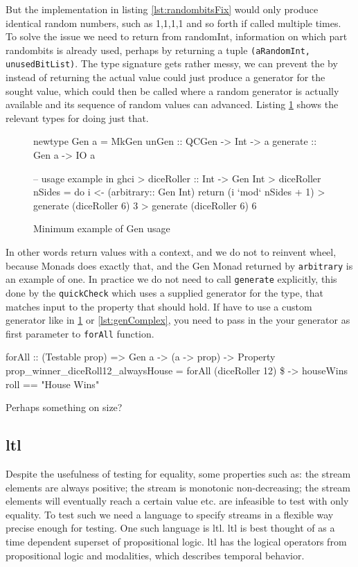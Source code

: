 But the implementation in listing \ref{lst:randombitsFix} would only produce identical random numbers, such as 1,1,1,1 and so forth if called multiple times. To solve the issue we need to return from randomInt, information on which part randombits is already used, perhaps by returning a tuple \verb|(aRandomInt, unusedBitList)|. The type signature gets rather messy, we can prevent the by instead of returning the actual value could just produce a generator for the sought value, which could then be called where a random generator is actually available and its sequence of random values can advanced. Listing \ref{lst:GenDef} shows the relevant types for doing just that. 
\begin{figure}
    \centering
    \begin{hscode}
    newtype Gen a = MkGen {
        unGen :: QCGen -> Int -> a
    }
    generate :: Gen a -> IO a
    
    -- usage example in ghci
    > diceRoller :: Int -> Gen Int
    > diceRoller nSides = do 
        i <- (arbitrary:: Gen Int) 
        return (i `mod` nSides + 1)
    > generate (diceRoller 6)
    3
    > generate (diceRoller 6)
    6
    \end{hscode}
    \caption{Minimum example of Gen usage}
    \label{lst:GenDef}
\end{figure}
In other words return values with a context, and we do not to reinvent wheel, because Monads does exactly that, and the Gen Monad returned by \verb|arbitrary| is an example of one.
In practice we do not need to call \verb|generate| explicitly, this done by the \verb|quickCheck| which uses a supplied generator for the type, that matches input to the property that should hold. If have to use a custom generator like in \ref{lst:GenDef} or \ref{lst:genComplex}, you need to pass in the your generator as first parameter to \verb|forAll| function.
\begin{hscode}
    forAll :: (Testable prop) => Gen a -> (a -> prop) -> Property
    prop_winner_diceRoll12_alwaysHouse = 
        forAll (diceRoller 12) \$ \roll -> houseWins roll == "House Wins"
\end{hscode}
Perhaps something on size?

\subsection{\acrlong{ltl}}
Despite the usefulness of testing for equality, some properties such as: the stream elements are always positive; the stream is monotonic non-decreasing; the stream elements will eventually reach a certain value etc. are infeasible to test with only equality. To test such we need a language to specify streams in a flexible way precise enough for testing. One such language is \acrfull{ltl}.
\acrshort{ltl} is best thought of as a time dependent superset of propositional logic. \acrshort{ltl} has the logical operators from propositional logic and modalities, which describes temporal behavior.

